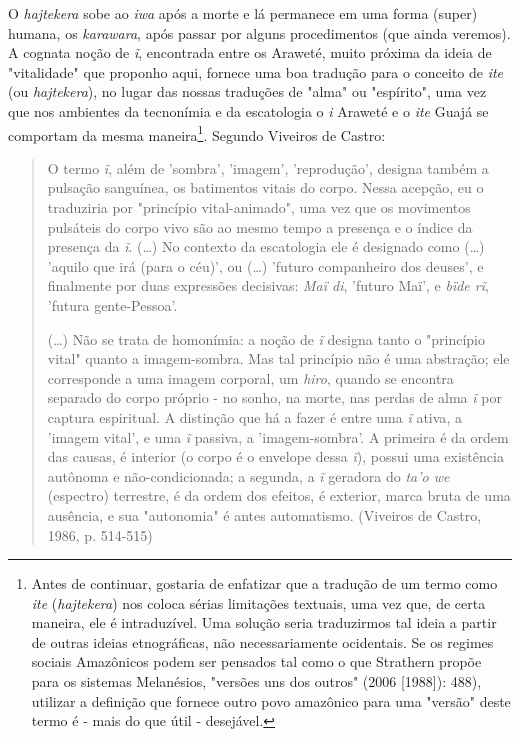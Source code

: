 O \emph{hajtekera} sobe ao \emph{iwa} após a morte e lá permanece em uma
forma (super) humana, os \emph{karawara}, após passar por alguns
procedimentos (que ainda veremos). A cognata noção de \emph{ĩ},
encontrada entre os Araweté, muito próxima da ideia de "vitalidade" que
proponho aqui, fornece uma boa tradução para o conceito de \emph{ite}
(ou \emph{hajtekera}), no lugar das nossas traduções de "alma" ou
"espírito", uma vez que nos ambientes da tecnonímia e da escatologia o
\emph{i} Araweté e o \emph{ite} Guajá se comportam da mesma
maneira\footnote{Antes de continuar, gostaria de enfatizar que a
  tradução de um termo como \emph{ite} (\emph{hajtekera}) nos coloca
  sérias limitações textuais, uma vez que, de certa maneira, ele é
  intraduzível. Uma solução seria traduzirmos tal ideia a partir de
  outras ideias etnográficas, não necessariamente ocidentais. Se os
  regimes sociais Amazônicos podem ser pensados tal como o que Strathern
  propõe para os sistemas Melanésios, "versões uns dos outros" (2006
  {[}1988{]}): 488), utilizar a definição que fornece outro povo
  amazônico para uma "versão" deste termo é - mais do que útil -
  desejável.}. Segundo Viveiros de Castro:

\begin{quote}
O termo \emph{ĩ}, além de 'sombra', 'imagem', 'reprodução', designa
também a pulsação sanguínea, os batimentos vitais do corpo. Nessa
acepção, eu o traduziria por "princípio vital-animado", uma vez que os
movimentos pulsáteis do corpo vivo são ao mesmo tempo a presença e o
índice da presença da \emph{ĩ}. (\ldots{}) No contexto da escatologia ele é
designado como (\ldots{}) 'aquilo que irá (para o céu)', ou (\ldots{}) 'futuro
companheiro dos deuses', e finalmente por duas expressões decisivas:
\emph{Maï di}, 'futuro Maï', e \emph{bïde rĩ}, 'futura gente-Pessoa'.

(\ldots{}) Não se trata de homonímia: a noção de \emph{ĩ} designa tanto o
"princípio vital" quanto a imagem-sombra. Mas tal princípio não é uma
abstração; ele corresponde a uma imagem corporal, um \emph{hiro}, quando
se encontra separado do corpo próprio - no sonho, na morte, nas perdas
de alma \emph{ĩ} por captura espiritual. A distinção que há a fazer é
entre uma \emph{ĩ} {ativa}, a 'imagem vital', e uma \emph{ĩ} {passiva},
a 'imagem-sombra'. A primeira é da ordem das causas, é {interior} (o
corpo é o envelope dessa \emph{ĩ}), possui uma existência autônoma e
não-condicionada; a segunda, a \emph{ĩ} geradora do \emph{ta'o we}
(espectro) terrestre, é da ordem dos efeitos, é exterior, marca bruta de
uma ausência, e sua "autonomia" é antes automatismo. (Viveiros de
Castro, 1986, p. 514-515)
\end{quote}

